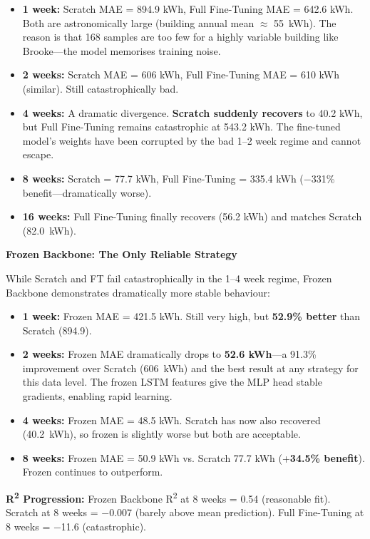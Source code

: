 \documentclass[12pt,a4paper]{report}
\begin{document}
\begin{itemize}
    \item \textbf{1 week:} Scratch MAE = 894.9 kWh, Full Fine-Tuning MAE = 642.6 kWh. Both are astronomically large (building annual mean $\approx$ 55~kWh). The reason is that 168 samples are too few for a highly variable building like Brooke—the model memorises training noise.
    \item \textbf{2 weeks:} Scratch MAE = 606 kWh, Full Fine-Tuning MAE = 610 kWh (similar). Still catastrophically bad.
    \item \textbf{4 weeks:} A dramatic divergence. \textbf{Scratch suddenly recovers} to 40.2 kWh, but Full Fine-Tuning remains catastrophic at 543.2 kWh. The fine-tuned model's weights have been corrupted by the bad 1--2 week regime and cannot escape.
    \item \textbf{8 weeks:} Scratch = 77.7 kWh, Full Fine-Tuning = 335.4 kWh ($-$331\% benefit—dramatically worse).
    \item \textbf{16 weeks:} Full Fine-Tuning finally recovers (56.2 kWh) and matches Scratch (82.0~kWh).
\end{itemize}

\textbf{Frozen Backbone: The Only Reliable Strategy}

While Scratch and FT fail catastrophically in the 1--4 week regime, Frozen Backbone demonstrates dramatically more stable behaviour:

\begin{itemize}
    \item \textbf{1 week:} Frozen MAE = 421.5 kWh. Still very high, but \textbf{52.9\% better} than Scratch (894.9).
    \item \textbf{2 weeks:} Frozen MAE dramatically drops to \textbf{52.6 kWh}—a 91.3\% improvement over Scratch (606~kWh) and the best result at any strategy for this data level. The frozen LSTM features give the MLP head stable gradients, enabling rapid learning.
    \item \textbf{4 weeks:} Frozen MAE = 48.5 kWh. Scratch has now also recovered (40.2~kWh), so frozen is slightly worse but both are acceptable.
    \item \textbf{8 weeks:} Frozen MAE = 50.9 kWh vs. Scratch 77.7 kWh (+\textbf{34.5\% benefit}). Frozen continues to outperform.
\end{itemize}

\textbf{R\textsuperscript{2} Progression:} Frozen Backbone R\textsuperscript{2} at 8 weeks = 0.54 (reasonable fit). Scratch at 8 weeks = $-$0.007 (barely above mean prediction). Full Fine-Tuning at 8 weeks = $-$11.6 (catastrophic).
\end{document}
